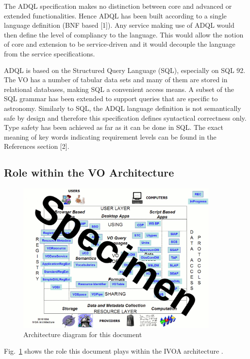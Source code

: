 \documentclass[11pt,a4paper]{ivoa}
\begin{document}
The ADQL specification makes no distinction between core and advanced or
extended functionalities. Hence ADQL has been built according to a single
language definition (BNF based [1]). Any service making use of ADQL would
then define the level of compliancy to the language. This would allow the
notion of core and extension to be service-driven and it would decouple the
language from the service specifications.

ADQL is based on the Structured Query Language (SQL), especially on SQL 92. The
VO has a number of tabular data sets and many of them are stored in relational
databases, making SQL a convenient access means. A subset of the SQL grammar
has been extended to support queries that are specific to astronomy. Similarly
to SQL, the ADQL language definition is not semantically safe by design and
therefore this specification defines syntactical correctness only. Type safety
has been achieved as far as it can be done in SQL. The exact meaning of key
words indicating requirement levels can be found in the References section [2].

\subsection{Role within the VO Architecture}

\begin{figure}
\centering
\includegraphics[width=0.9\textwidth]{archdiag.png}
\caption{Architecture diagram for this document}
\label{fig:archdiag}
\end{figure}

Fig.~\ref{fig:archdiag} shows the role this document plays within the
IVOA architecture \citep{note:VOARCH}.
\end{document}

